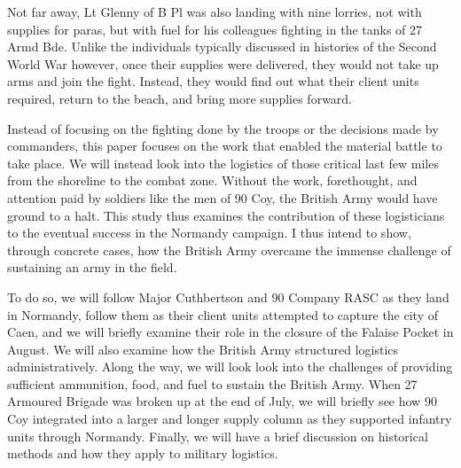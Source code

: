 \documentclass[noraggedright]{turabian-researchpaper}
\begin{document}
Not far away, Lt Glenny of B Pl was also landing with nine lorries, not with 
supplies for paras, but with fuel for his colleagues fighting in the tanks of 
27 Armd Bde.\autocite[6 June 1944]{90wd} Unlike the individuals typically 
discussed in histories of the Second World War however, once their supplies 
were delivered, they would not take up arms and join the fight. Instead, they 
would find out what their client units required, return to the beach, and 
bring more supplies forward.

Instead of focusing on the fighting done by the troops or
the decisions made by commanders, this paper focuses on the work that enabled
the material battle to take place.  
We will instead look into the logistics of those critical last few miles 
from the shoreline to the combat zone. Without the work, forethought, and 
attention paid by soldiers like the men of 90 Coy, the British Army would 
have ground to a halt.  This study thus examines the contribution of these 
logisticians to the eventual success in the Normandy campaign.  I thus intend 
to show, through concrete cases, how the British Army overcame the immense 
challenge of sustaining an army in the field.  

To do so, we will follow Major Cuthbertson and 90 Company RASC as they land 
in Normandy, follow them as their client units attempted to 
capture the city of Caen, and we will briefly examine their role in the 
closure of the Falaise Pocket in August. %
We will also examine how the British Army structured logistics 
administratively.  Along the way, we will look look into the challenges of 
providing sufficient ammunition, food, and fuel to sustain the British Army.  
When 27 Armoured Brigade was broken up at the end of July, we will briefly 
see how 90 Coy integrated into a larger and longer supply column as they 
supported infantry units through Normandy. Finally, we will have a 
brief discussion on historical methods and how they apply to military 
logistics.  
\end{document}
